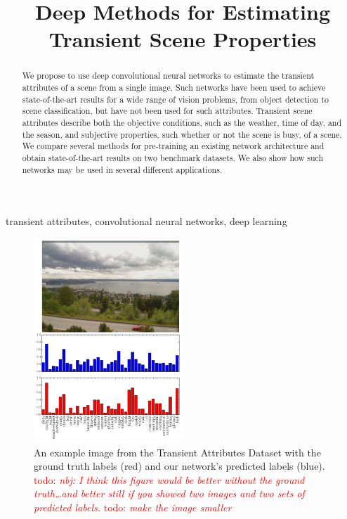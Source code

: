 \documentclass{article}
\title{Deep Methods for Estimating Transient Scene Properties}
\newcommand{\todo}[1]{\textcolor{red}{todo: {\em #1}}}
\begin{document}
\maketitle

\begin{abstract}

We propose to use deep convolutional neural networks to estimate the
transient attributes of a scene from a single image. Such networks
have been used to achieve state-of-the-art results for a wide range of
vision problems, from object detection to scene classification, but
have not been used for such attributes. Transient scene attributes
describe both the objective conditions, such as the weather, time of
day, and the season, and subjective properties, such whether or not
the scene is busy, of a scene. We compare several methods for
pre-training an existing network architecture and obtain
state-of-the-art results on two benchmark datasets.  We also show how
such networks may be used in several different applications.

\end{abstract}

\begin{keywords}
transient attributes, convolutional neural networks, deep learning
\end{keywords}

\begin{figure}
	\centering
		\includegraphics[width=0.5\textwidth]{figs/bars.pdf}

		\caption{An example image from the Transient Attributes Dataset with the ground truth labels
						 (red) and our network's predicted labels (blue).
         \todo{nbj: I think this figure would be better
         without the ground truth\dots and better still if you
         showed two images and two sets of predicted labels.}
         \todo{make the image smaller}}
             
    \label{fig:results}
\end{figure}
\end{document}
